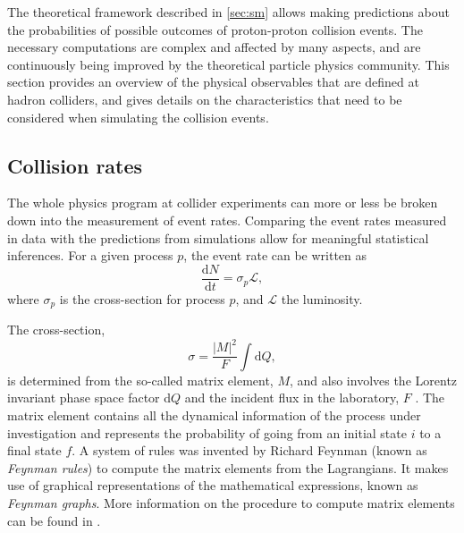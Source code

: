 
The theoretical framework described in \cref{sec:sm} allows making predictions about the probabilities of possible outcomes of proton-proton collision events. 
The necessary computations are complex and affected by many aspects, and are continuously being improved by the theoretical particle physics community.
This section provides an overview of the physical observables that are defined at hadron colliders, and gives details on the characteristics that need to be considered when simulating the collision events. 


\subsection{Collision rates}
The whole physics program at collider experiments can more or less be broken down into the measurement of event rates. Comparing the event rates measured in data with the predictions from simulations allow for meaningful statistical inferences.
For a given process $p$, the event rate can be written as
\begin{equation}
  \frac{\mathrm{d}N}{\mathrm{d}t} = \sigma_p \mathcal{L},
\end{equation}
where $\sigma_p$ is the cross-section for process $p$, and $\mathcal{L}$ the luminosity.

The cross-section,
\begin{equation}
  \sigma = \frac{|M|^2}{F} \int \text{d}Q,
\end{equation}
is determined from the so-called matrix element, $M$, and also involves the Lorentz invariant phase space factor d$Q$ and the incident flux in the laboratory, $F$ \cite{Halzen:1984mc}.
The matrix element contains all the dynamical information of the process under investigation and represents the probability of going from an initial state $i$ to a final state $f$. 
A system of rules was invented by Richard Feynman (known as \emph{Feynman rules}) to compute the matrix elements from the Lagrangians. It makes use of graphical representations of the mathematical expressions, known as \emph{Feynman graphs}. More information on the procedure to compute matrix elements can be found in .

